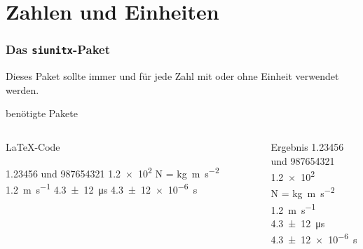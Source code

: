 \section{Zahlen und Einheiten}
\begin{frame}[fragile]
    \frametitle{Das \texttt{siunitx}-Paket \hfill{}}
    Dieses Paket sollte immer und für jede Zahl mit oder ohne Einheit verwendet werden.

   \begin{block}{benötigte Pakete}
    \begin{lstverbatim}
        \usepackage[locale=DE, separate-uncertainty=true, per-mode=fraction]
                   {siunitx}
    \end{lstverbatim}
   \end{block}
    \begin{columns}[T]
        \begin{column}{0.6\textwidth}
            \begin{block}{\LaTeX-Code}
                \begin{lstverbatim}
                \num{1.23456} und \num{987654321}
                \num{1.2e2}
                \si{\newton} = \si{\kilo\gram\metre\per\second\squared}
                \SI{1.2}{\metre\per\second}
                \SI{4,3(12)}{\micro\second}
                \SI{4,3(12)e-6}{\second}
                \end{lstverbatim}
            \end{block}
        \end{column}
        \begin{column}{0.35\textwidth}
            \begin{block}{Ergebnis}
                \num{1.23456} und \num{987654321} \\
                \num{1.2e2} \\
                \smallbreak
                \si{\newton} = \si{\kilo\gram\metre\per\second\squared} \\
                \medbreak
                \SI{1.2}{\metre\per\second} \\
                \SI{4,3(12)}{\micro\second}
                \SI{4,3(12)e-6}{\second}
            \end{block}
        \end{column}
    \end{columns}
\end{frame}

